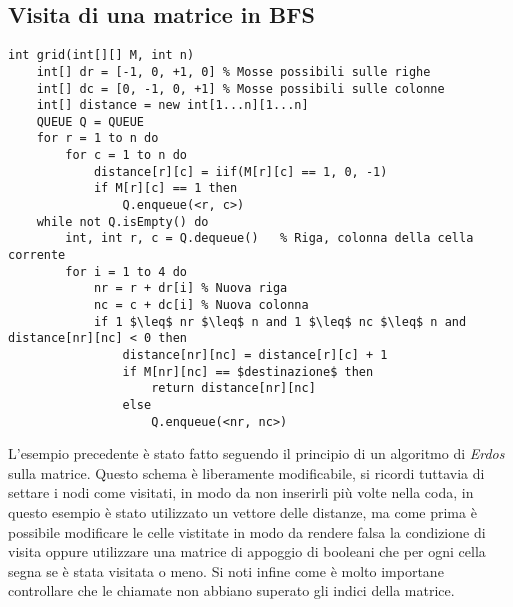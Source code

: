 \documentclass[../cheatSheetAlgoritmi.tex]{subfiles}
\begin{document}
\subsection{Visita di una matrice in BFS}
\begin{lstlisting}[caption=Schema BFS con Matrice quadra]
int grid(int[][] M, int n)
	int[] dr = [-1, 0, +1, 0] % Mosse possibili sulle righe
  	int[] dc = [0, -1, 0, +1] % Mosse possibili sulle colonne
  	int[] distance = new int[1...n][1...n]
  	QUEUE Q = QUEUE
  	for r = 1 to n do
    	for c = 1 to n do
      		distance[r][c] = iif(M[r][c] == 1, 0, -1)
      		if M[r][c] == 1 then
        		Q.enqueue(<r, c>)
  	while not Q.isEmpty() do
    	int, int r, c = Q.dequeue()   % Riga, colonna della cella corrente
    	for i = 1 to 4 do
      		nr = r + dr[i] % Nuova riga
      		nc = c + dc[i] % Nuova colonna
      		if 1 $\leq$ nr $\leq$ n and 1 $\leq$ nc $\leq$ n and distance[nr][nc] < 0 then
        		distance[nr][nc] = distance[r][c] + 1
        		if M[nr][nc] == $destinazione$ then
          			return distance[nr][nc]
        		else
          			Q.enqueue(<nr, nc>)
\end{lstlisting}
L'esempio precedente è stato fatto seguendo il principio di un algoritmo di \textit{Erdos} sulla matrice. Questo schema è liberamente modificabile, si ricordi tuttavia di settare i nodi come visitati, in modo da non inserirli più volte nella coda, in questo esempio è stato utilizzato un vettore delle distanze, ma come prima è possibile modificare le celle vistitate in modo da rendere falsa la condizione di visita oppure utilizzare una matrice di appoggio di booleani che per ogni cella segna se è stata visitata o meno. Si noti infine come è molto importane controllare che le chiamate non abbiano superato gli indici della matrice.

\newpage
\end{document}
